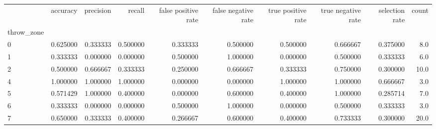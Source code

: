 \begin{tabular}{lrrrrrrrrr}
\toprule
{} &  accuracy &  precision &    recall &  false positive rate &  false negative rate &  true positive rate &  true negative rate &  selection rate &  count \\
throw\_zone &           &            &           &                      &                      &                     &                     &                 &        \\
\midrule
0          &  0.625000 &   0.333333 &  0.500000 &             0.333333 &             0.500000 &            0.500000 &            0.666667 &        0.375000 &    8.0 \\
1          &  0.333333 &   0.000000 &  0.000000 &             0.500000 &             1.000000 &            0.000000 &            0.500000 &        0.333333 &    6.0 \\
2          &  0.500000 &   0.666667 &  0.333333 &             0.250000 &             0.666667 &            0.333333 &            0.750000 &        0.300000 &   10.0 \\
4          &  1.000000 &   1.000000 &  1.000000 &             0.000000 &             0.000000 &            1.000000 &            1.000000 &        0.666667 &    3.0 \\
5          &  0.571429 &   1.000000 &  0.400000 &             0.000000 &             0.600000 &            0.400000 &            1.000000 &        0.285714 &    7.0 \\
6          &  0.333333 &   0.000000 &  0.000000 &             0.500000 &             1.000000 &            0.000000 &            0.500000 &        0.333333 &    3.0 \\
7          &  0.650000 &   0.333333 &  0.400000 &             0.266667 &             0.600000 &            0.400000 &            0.733333 &        0.300000 &   20.0 \\
\bottomrule
\end{tabular}
